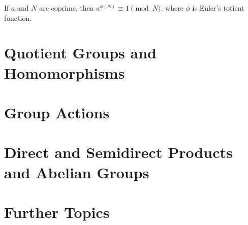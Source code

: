 \begin{theorem}
If $a$ and $N$ are coprime, then $a^{\phi(N)}\equiv1\pmod N$, where $\phi$ is Euler's totient function.
\end{theorem}

\section{Quotient Groups and Homomorphisms}

\section{Group Actions}

\section{Direct and Semidirect Products and Abelian Groups}

\section{Further Topics}